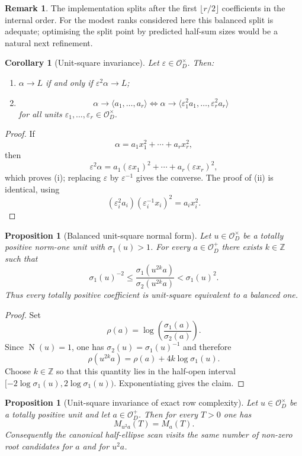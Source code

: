 \documentclass[manuscript]{acmart}
\theoremstyle{plain}
\newtheorem{proposition}[theorem]{Proposition}
\newtheorem{corollary}[theorem]{Corollary}
\theoremstyle{definition}
\theoremstyle{nonitalicremark}
\newtheorem{remark}[theorem]{Remark}
\newcommand{\Z}{\mathbb{Z}}
\newcommand{\OO}{\mathcal{O}}
\newcommand{\OD}{\OO_D}
\newcommand{\N}{\operatorname{N}}
\newcommand{\eps}{\varepsilon}
\begin{document}
\begin{remark}
The implementation splits after the first $\lfloor r/2\rfloor$ coefficients in the internal order.
For the modest ranks considered here this balanced split is adequate; optimising the split point by
predicted half-sum sizes would be a natural next refinement.
\end{remark}

\begin{corollary}[Unit-square invariance]\label{cor:units}
Let $\eps\in\OD^\times$. Then:
\begin{enumerate}[label=\textup{(\roman*)}]
\item $\alpha\to L$ if and only if $\eps^2\alpha\to L$;
\item
\[
\alpha\to\langle a_1,\dots,a_r\rangle
\iff
\alpha\to\langle \eps_1^2a_1,\dots,\eps_r^2a_r\rangle
\]
for all units $\eps_1,\dots,\eps_r\in\OD^\times$.
\end{enumerate}
\end{corollary}

\begin{proof}
If
\[
\alpha=a_1x_1^2+\cdots+a_rx_r^2,
\]
then
\[
\eps^2\alpha=a_1(\eps x_1)^2+\cdots+a_r(\eps x_r)^2,
\]
which proves \textup{(i)}; replacing $\eps$ by $\eps^{-1}$ gives the converse. The proof of
\textup{(ii)} is identical, using
\[
(\eps_i^2a_i)(\eps_i^{-1}x_i)^2 = a_i x_i^2.
\]
\end{proof}

\begin{proposition}[Balanced unit-square normal form]\label{prop:balanced}
Let $u\in\OD^\times$ be a totally positive norm-one unit with $\sigma_1(u)>1$. For every
$a\in\OD^+$ there exists $k\in\Z$ such that
\[
\sigma_1(u)^{-2}
\le
\frac{\sigma_1(u^{2k}a)}{\sigma_2(u^{2k}a)}
<
\sigma_1(u)^2.
\]
Thus every totally positive coefficient is unit-square equivalent to a balanced one.
\end{proposition}

\begin{proof}
Set
\[
\rho(a)=\log\!\left(\frac{\sigma_1(a)}{\sigma_2(a)}\right).
\]
Since $\N(u)=1$, one has $\sigma_2(u)=\sigma_1(u)^{-1}$ and therefore
\[
\rho(u^{2k}a)=\rho(a)+4k\log\sigma_1(u).
\]
Choose $k\in\Z$ so that this quantity lies in the half-open interval
$[-2\log\sigma_1(u), 2\log\sigma_1(u))$. Exponentiating gives the claim.
\end{proof}

\begin{proposition}[Unit-square invariance of exact row complexity]\label{prop:balance-invariant}
Let $u\in\OD^\times$ be a totally positive unit and let $a\in\OD^+$. Then for every $T>0$ one has
\[
M_{u^2a}(T)=M_a(T).
\]
Consequently the canonical half-ellipse scan visits the same number of non-zero root candidates for
$a$ and for $u^2a$.
\end{proposition}
\end{document}
